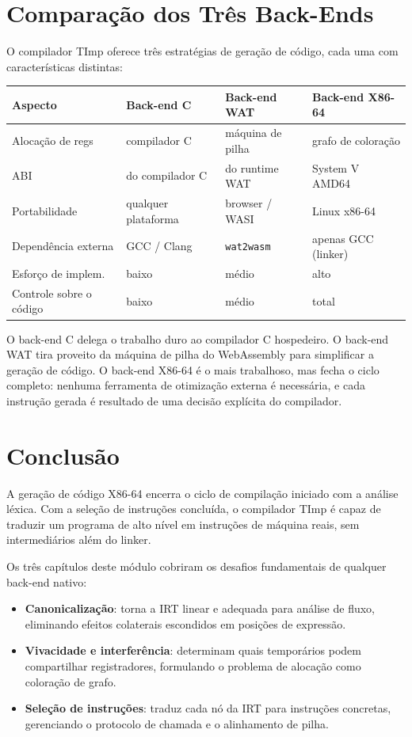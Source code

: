 \section{Comparação dos Três Back-Ends}

O compilador TImp oferece três estratégias de geração de código, cada uma
com características distintas:

\begin{center}
  \begin{tabular}{llll}
    \toprule
    Aspecto & Back-end C & Back-end WAT & Back-end X86-64 \\
    \midrule
    Alocação de regs & compilador C & máquina de pilha & grafo de coloração \\
    ABI & do compilador C & do runtime WAT & System V AMD64 \\
    Portabilidade & qualquer plataforma & browser / WASI & Linux x86-64 \\
    Dependência externa & GCC / Clang & \texttt{wat2wasm} & apenas
    GCC (linker) \\
    Esforço de implem. & baixo & médio & alto \\
    Controle sobre o código & baixo & médio & total \\
    \bottomrule
  \end{tabular}
\end{center}

O back-end C delega o trabalho duro ao compilador C hospedeiro.
O back-end WAT tira proveito da máquina de pilha do WebAssembly para
simplificar a geração de código. O back-end X86-64 é o mais trabalhoso,
mas fecha o ciclo completo: nenhuma ferramenta de otimização externa é
necessária, e cada instrução gerada é resultado de uma decisão explícita
do compilador.

\section{Conclusão}

A geração de código X86-64 encerra o ciclo de compilação iniciado com a
análise léxica. Com a seleção de instruções concluída, o compilador TImp
é capaz de traduzir um programa de alto nível em instruções de máquina
reais, sem intermediários além do linker.

Os três capítulos deste módulo cobriram os desafios fundamentais de qualquer
back-end nativo:

\begin{itemize}
  \item \textbf{Canonicalização}: torna a IRT linear e adequada para análise
    de fluxo, eliminando efeitos colaterais escondidos em posições de expressão.
  \item \textbf{Vivacidade e interferência}: determinam quais temporários
    podem compartilhar registradores, formulando o problema de alocação como
    coloração de grafo.
  \item \textbf{Seleção de instruções}: traduz cada nó da IRT para instruções
    concretas, gerenciando o protocolo de chamada e o alinhamento de pilha.
\end{itemize}

